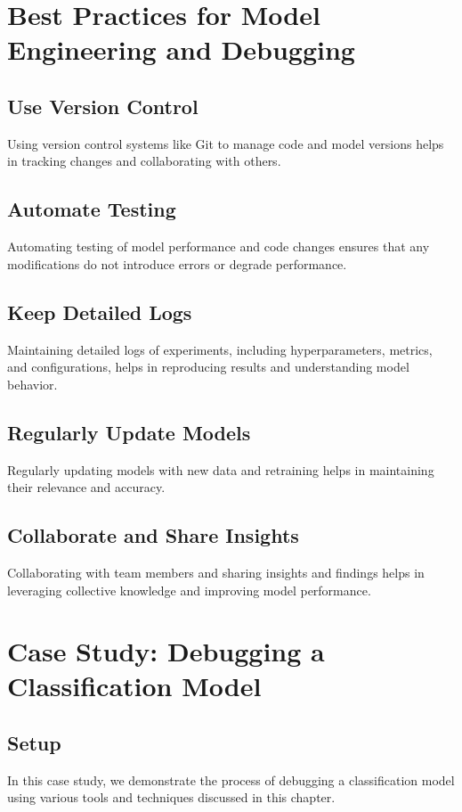 \section{Best Practices for Model Engineering and Debugging}

\subsection{Use Version Control}
Using version control systems like Git to manage code and model versions helps in tracking changes and collaborating with others.

\subsection{Automate Testing}
Automating testing of model performance and code changes ensures that any modifications do not introduce errors or degrade performance.

\subsection{Keep Detailed Logs}
Maintaining detailed logs of experiments, including hyperparameters, metrics, and configurations, helps in reproducing results and understanding model behavior.

\subsection{Regularly Update Models}
Regularly updating models with new data and retraining helps in maintaining their relevance and accuracy.

\subsection{Collaborate and Share Insights}
Collaborating with team members and sharing insights and findings helps in leveraging collective knowledge and improving model performance.

\section{Case Study: Debugging a Classification Model}

\subsection{Setup}
In this case study, we demonstrate the process of debugging a classification model using various tools and techniques discussed in this chapter.

